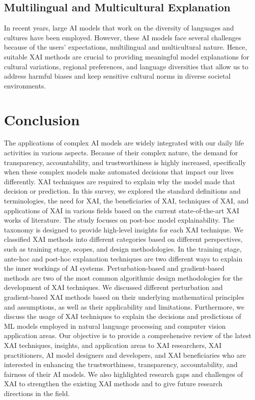 \documentclass[final,5p,times,twocolumn]{elsarticle}
\begin{document}
\subsection{Multilingual and Multicultural Explanation}
In recent years, large AI models that work on the diversity of languages and cultures have been employed. However, these AI models face several challenges because of the users' expectations, multilingual and multicultural nature. Hence, suitable XAI methods are crucial to providing meaningful model explanations for cultural variations, regional preferences, and language diversities that allow us to address harmful biases and keep sensitive cultural norms in diverse societal environments.

\section{Conclusion} \label{sectionConclusion}
The applications of complex AI models are widely integrated with our daily life activities in various aspects. Because of their complex nature, the demand for transparency, accountability, and trustworthiness is highly increased, specifically when these complex models make automated decisions that impact our lives differently. XAI techniques are required to explain why the model made that decision or prediction. In this survey, we explored the standard definitions and terminologies, the need for XAI, the beneficiaries of XAI, techniques of XAI, and applications of XAI in various fields based on the current state-of-the-art XAI works of literature. The study focuses on post-hoc model explainability. The taxonomy is designed to provide high-level insights for each XAI technique. We classified XAI methods into different categories based on different perspectives, such as training stage, scopes, and design methodologies. 
In the training stage, ante-hoc and post-hoc explanation techniques are two different ways to explain the inner workings of AI systems. 
Perturbation-based and gradient-based methods are two of the most common algorithmic design methodologies for the development of XAI techniques. 
We discussed different perturbation and gradient-based XAI methods based on their underlying mathematical principles and assumptions, as well as their applicability and limitations. Furthermore, we discuss the usage of XAI techniques to explain the decisions and predictions of ML models employed in natural language processing and computer vision application areas. Our objective is to provide a comprehensive review of the latest XAI techniques, insights, and application areas to XAI researchers, XAI practitioners, AI model designers and developers, and XAI beneficiaries who are interested in enhancing the trustworthiness, transparency, accountability, and fairness of their AI models. We also highlighted research gaps and challenges of XAI to strengthen the existing XAI methods and to give future research directions in the field.





\end{document}
